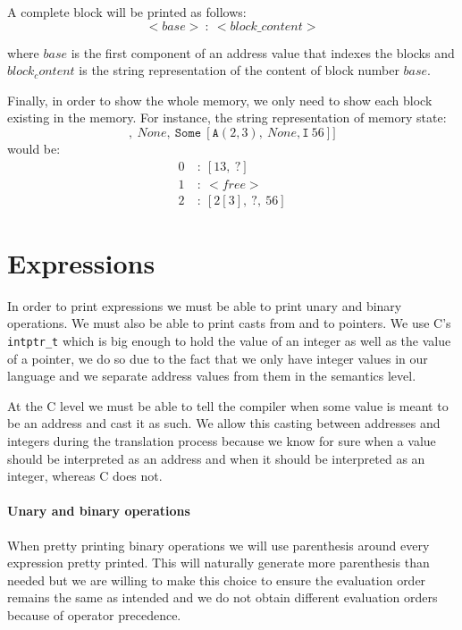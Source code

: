 A complete block will be printed as follows:
\begin{equation*}
<base>\ :\ <block\_content> 
\end{equation*}

where $base$ is the first component of an address value that indexes the blocks and $block_content$ is the string representation of the content of block number $base$.

Finally, in order to show the whole memory, we only need to show each block existing in the memory.
For instance, the string representation of memory state:
\begin{equation*}
[\mathtt{Some}\ [\mathtt{I}\ 13,\ \mathtt{None}],\ None,\ \mathtt{Some}\ [\mathtt{A}(2,3),\ None, \mathtt{I}\ 56]]
\end{equation*}
would be:
\begin{align*}
0\ &:\ [13,\ ?] \\
1\ &:\ <free> \\
2\ &:\ [2[3],\ ?,\ 56]
\end{align*}


\section{Expressions}
In order to print expressions we must be able to print unary and binary operations.
We must also be able to print casts from and to pointers.
We use C's \verb|intptr_t| which is big enough to hold the value of an integer as well as the value of a pointer, we do so due to the fact that we only have integer values in our language and we separate address values from them in the semantics level.

At the C level we must be able to tell the compiler when some value is meant to be an address and cast it as such.
We allow this casting between addresses and integers during the translation process because we know for sure when a value should be interpreted as an address and when it should be interpreted as an integer, whereas C does not.

\paragraph{Unary and binary operations}
When pretty printing binary operations we will use parenthesis around every expression pretty printed.
This will naturally generate more parenthesis than needed but we are willing to make this choice to ensure the evaluation order remains the same as intended and we do not obtain different evaluation orders because of operator precedence.

